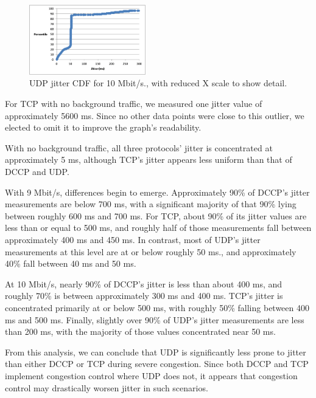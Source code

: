 \begin{figure}[!h]
   \centering
      \includegraphics[width=0.45\textwidth]{pics/udp_10_jitter_closeup}
   \caption{UDP jitter CDF for 10 Mbit/s., with reduced X scale to show detail.}
\label{fig:udp_10_jitter_closeup}
\end{figure}

For TCP with no background traffic, we measured one jitter value of
approximately 5600 ms. Since no other data points were close to this outlier, we
elected to omit it to improve the graph's readability.

With no background traffic, all three protocols' jitter is concentrated at
approximately 5 ms, although TCP's jitter appears less uniform than that of DCCP
and UDP.

With 9 Mbit/s, differences begin to emerge. Approximately 90\% of DCCP's jitter
measurements are below 700 ms, with a significant majority of that 90\% lying
between roughly 600 ms and 700 ms. For TCP, about 90\% of its jitter values are
less than or equal to 500 ms, and roughly half of those measurements fall
between approximately 400 ms and 450 ms. In contrast, most of UDP's jitter
measurements at this level are at or below roughly 50 ms., and approximately
40\% fall between 40 ms and 50 ms.

At 10 Mbit/s, nearly 90\% of DCCP's jitter is less than about 400 ms, and
roughly 70\% is between approximately 300 ms and 400 ms. TCP's jitter is
concentrated primarily at or below 500 ms, with roughly 50\% falling between 400
ms and 500 ms. Finally, slightly over 90\% of UDP's jitter measurements are less
than 200 ms, with the majority of those values concentrated near 50 ms.

From this analysis, we can conclude that UDP is significantly less prone to
jitter than either DCCP or TCP during severe congestion. Since both DCCP and TCP
implement congestion control where UDP does not, it appears that congestion
control may drastically worsen jitter in such scenarios.

